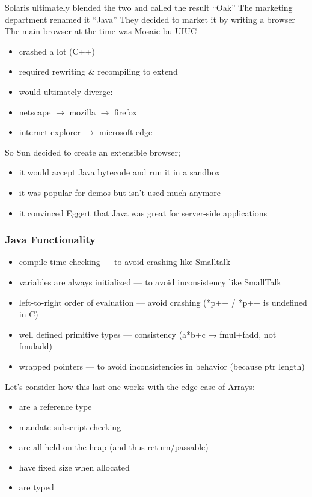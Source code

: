\documentclass[../../lecture_notes.tex]{subfiles}
\begin{document}
\noindent Solaris ultimately blended the two and called the result “Oak”
The marketing department renamed it “Java”
They decided to market it by writing a browser
The main browser at the time was Mosaic bu UIUC
\begin{itemize} [itemsep=0mm]
	\item crashed a lot (C++)
	\item required rewriting \& recompiling to extend
	\item would ultimately diverge:
	\item netscape $\rightarrow$ mozilla $\rightarrow$ firefox
	\item internet explorer $\rightarrow$ microsoft edge
\end{itemize}
\noindent So Sun decided to create an extensible browser;
\begin{itemize} [itemsep=0mm]
	\item it would accept Java bytecode and run it in a sandbox
	\item it was popular for demos but isn’t used much anymore
	\item it convinced Eggert that Java was great for server-side applications
 \end{itemize}

\subsubsection*{Java Functionality}
\begin{itemize} [itemsep=0mm]
	\item compile-time checking — to avoid crashing like Smalltalk
	\item variables are always initialized — to avoid inconsistency like SmallTalk
	\item left-to-right order of evaluation — avoid crashing (*p++ / *p++ is undefined in C)
	\item well defined primitive types — consistency (a*b+c → fmul+fadd, not fmuladd)
	\item wrapped pointers — to avoid inconsistencies in behavior (because ptr length)
\end{itemize}
Let’s consider how this last one works with the edge case of Arrays:
\begin{itemize} [itemsep=0mm]
	\item are a reference type
	\item mandate subscript checking
	\item are all held on the heap (and thus return/passable)
	\item have fixed size when allocated
	\item are typed
\end{itemize}
\end{document}
